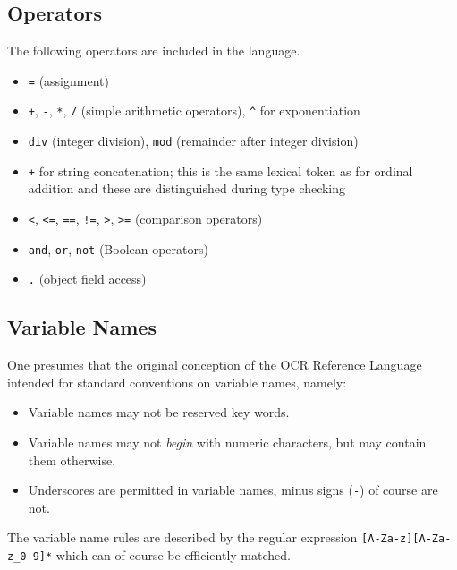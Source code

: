 \documentclass{article}
\newcommand{\code}[1]{\colorbox{gray!20}{\texttt{#1}}}
\begin{document}
    \subsection{Operators}
    The following operators are included in the language. 
    \begin{itemize}
        \item \code{=} (assignment)
        \item \code{+}, \code{-}, \code{*}, \code{/} (simple arithmetic operators), \code{\textasciicircum} for exponentiation
        \item \code{div} (integer division), \code{mod} (remainder after integer division)
        \item \code {+} for string concatenation; this is the same lexical token as for ordinal addition and these are distinguished during type checking
        \item \code{<}, \code{<=}, \code{==}, \code{!=}, \code{>}, \code{>=} (comparison operators)
        \item \code{and}, \code{or}, \code{not} (Boolean operators)
        \item \code{.} (object field access)
    \end{itemize}

    \subsection{Variable Names}
    One presumes that the original conception of the OCR Reference Language intended for standard conventions on variable names, namely:
    \begin{itemize}
        \item Variable names may not be reserved key words.
        \item Variable names may not \emph{begin} with numeric characters, but may contain them otherwise.
        \item Underscores are permitted in variable names, minus signs (\code{-}) of course are not. 
    \end{itemize}

    The variable name rules are described by the regular expression \code{[A-Za-z][A-Za-z\_0-9]*} which can of course be efficiently matched.
\end{document}
